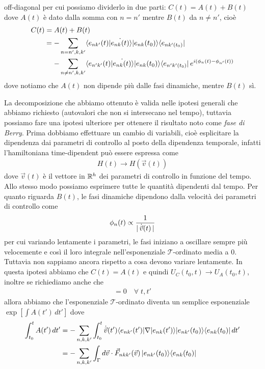off-diagonal per cui possiamo dividerlo in due parti: $ C(t) = A(t) + B(t) $ dove $ A(t) $ è dato dalla somma con $ n = n' $ mentre $ B(t) $ da 
$ n \neq n' $, cioè 
\begin{align*}
  C(t) = A&(t) + B(t) 
  \\
  = - &\sum_{n = n',k,k'} \bk{e_{nk'}(t) |\dot{ e_{nk}(t)}} \k{e_{nk}(t_0)} \b{e_{nk'(t_0)}} 
  \\
  - &\sum_{n \neq n',k,k'} \bk{e_{n'k'}(t) |\dot{ e_{nk}(t)}} \k{e_{nk}(t_0)} \b{e_{n'k'(t_0)}} \,e^{ i(\phi_n(t) - \phi_{n'}(t))}
\end{align*}
dove notiamo che $ A(t) $ non dipende più dalle fasi dinamiche, mentre $ B(t) $ sì.

La decomposizione che abbiamo ottenuto è valida nelle ipotesi generali che abbiamo richiesto (autovalori che non si intersecano nel tempo), tuttavia 
possiamo fare una ipotesi ulteriore per ottenere il risultato noto come \textit{fase di Berry}. Prima dobbiamo effettuare un cambio di variabili, 
cioè esplicitare la dipendenza dai parametri di controllo al posto della dipendenza temporale, infatti l'hamiltoniana time-dipendent può essere espressa 
come 
\begin{align*}
  H(t) \to H(\vec{v}(t))
\end{align*}
dove $ \vec{v}(t) $ è il vettore in $ \mathbb{R}^h $ dei parametri di controllo in funzione del tempo. Allo stesso modo possiamo esprimere tutte le quantità 
dipendenti dal tempo. Per quanto riguarda $ B(t) $, le fasi dinamiche dipendono dalla velocità dei parametri di controllo come 
\begin{align*}
  \phi_n(t) \propto \frac1{\DS |\, \dot{\vec{v}}(t) \,| }
\end{align*}
per cui variando lentamente i parametri, le fasi iniziano a oscillare sempre più velocemente e così il loro integrale nell'esponenziale 
$ \mathcal{T} $-ordinato media a $ 0 $. Tuttavia non sappiamo ancora rispetto a cosa devono variare lentamente. In questa ipotesi abbiamo che 
$ C(t) = A(t) $ e quindi $ U_C(t_0,t) \to U_A(t_0,t) $, inoltre se richiediamo anche che 
\begin{align*}
  [A(t), A(t')] = 0 \quad \forall\; t,t'
\end{align*}
allora abbiamo che l'esponenziale $ \mathcal{T} $-ordinato diventa un semplice esponenziale $ \exp\left[ \int A(t') \,dt' \right] $ 
dove 
\begin{align*}
  \int_{t_0}^t A(t') \, dt' 
  &= -\sum_{n,k,k'} \int_{t_0}^t \dot{\vec{v}}(t') \langle e_{nk'}(t') | \nabla | e_{nk}(t')  \rangle \vert e_{nk'}(t_0) \rangle \langle e_{nk}(t_0) \vert\,dt'
  \\
  &= - \sum_{n,k,k'} \int_\Gamma d\vec{v}  \cdot \vec{F}_{nkk'}(\vec{v}) \,\vert e_{nk'}(t_0) \rangle \langle e_{nk}(t_0) \vert
\end{align*}
